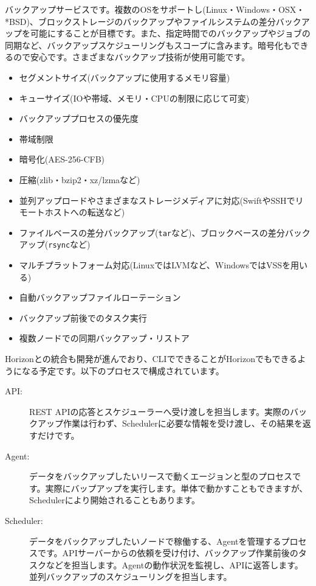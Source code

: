 バックアップサービスです。複数のOSをサポートし(Linux・Windows・OSX・*BSD)、ブロックストレージのバックアップやファイルシステムの差分バックアップを可能にすることが目標です。また、指定時間でのバックアップやジョブの同期など、バックアップスケジューリングもスコープに含みます。暗号化もできるので安心です。さまざまなバックアップ技術が使用可能です。

\begin{itemize}
	\item セグメントサイズ(バックアップに使用するメモリ容量)
	\item キューサイズ(IOや帯域、メモリ・CPUの制限に応じて可変)
	\item バックアッププロセスの優先度
	\item 帯域制限
	\item 暗号化(AES-256-CFB)
	\item 圧縮(zlib・bzip2・xz/lzmaなど)
	\item 並列アップロードやさまざまなストレージメディアに対応(SwiftやSSHでリモートホストへの転送など)
	\item ファイルベースの差分バックアップ(\verb|tar|など)、ブロックベースの差分バックアップ(\verb|rsync|など)
	\item マルチプラットフォーム対応(LinuxではLVMなど、WindowsではVSSを用いる)
	\item 自動バックアップファイルローテーション
	\item バックアップ前後でのタスク実行
	\item 複数ノードでの同期バックアップ・リストア
\end{itemize}

Horizonとの統合も開発が進んでおり、CLIでできることがHorizonでもできるようになる予定です。以下のプロセスで構成されています。

\begin{description}
	\item[API:] REST APIの応答とスケジューラーへ受け渡しを担当します。実際のバックアップ作業は行わず、Schedulerに必要な情報を受け渡し、その結果を返すだけです。
	\item[Agent:] データをバックアップしたいリースで動くエージョンと型のプロセスです。実際にバップアップを実行します。単体で動かすこともできますが、Schedulerにより開始されることもあります。
	\item[Scheduler:] データをバックアップしたいノードで稼働する、Agentを管理するプロセスです。APIサーバーからの依頼を受け付け、バックアップ作業前後のタスクなどを担当します。Agentの動作状況を監視し、APIに返答します。並列バックアップのスケジューリングを担当します。
\end{description}

